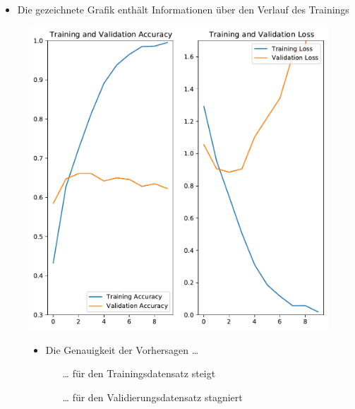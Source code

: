 \documentclass[t]{beamer}
\begin{document}
\begin{frame}
    \begin{itemize}
        \item Die gezeichnete Grafik enthält Informationen über den Verlauf des Trainings
    \end{itemize}
    \begin{figure}
        \begin{minipage}{0.5\textwidth}
            \includegraphics[width=\textwidth]{./teach-plots/pre_augmentation-fixed.pdf}
        \end{minipage}\hfill
        \begin{minipage}{0.5\textwidth}
            \begin{itemize}
                \item Die Genauigkeit der Vorhersagen \ldots
                \begin{itemize}
                    \item[\ldots] für den Trainingsdatensatz steigt
                    \item[\ldots] für den Validierungsdatensatz stagniert
                \end{itemize}
            \end{itemize}
        \end{minipage}
    \end{figure}
\end{frame}
\end{document}
